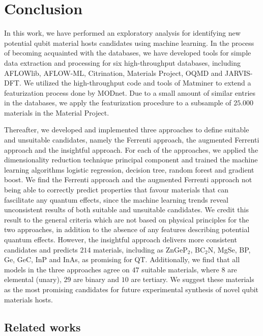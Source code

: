 \chapter*{Conclusion}

In this work, we have performed an exploratory analysis for identifying new potential qubit material hosts candidates using machine learning. In the process of becoming acquainted with the databases, we have developed tools for simple data extraction and processing for six high-throughput databases, including AFLOWlib, AFLOW-ML, Citrination, Materials Project, OQMD and JARVIS-DFT. We utilized the high-throughput code and tools of Matminer to extend a featurization process done by MODnet. Due to a small amount of similar entries in the databases, we apply the featurization procedure to a subsample of $25.000$ materials in the Material Project.

Thereafter, we developed and implemented three approaches to define suitable and unsuitable candidates, namely the Ferrenti approach, the augmented Ferrenti approach and the insightful approach. For each of the approaches, we applied the dimensionality reduction technique principal component and trained the machine learning algorithms logistic regression, decision tree, random forest and gradient boost. We find the Ferrenti approach and the augmented Ferrenti approach not being able to correctly predict properties that favour materials that can fascilitate any quantum effects, since the machine learning trends reveal unconsistent results of both suitable and unsuitable candidates. We credit this result to the general criteria which are not based on physical principles for the two approaches, in addition to the absence of any features describing potential quantum effects. However, the insightful approach delivers more consistent candidates and predicts $214$ materials, including as ZnGeP$_2$, BC$_2$N, MgSe, BP, Ge, GeC, InP and InAs, as promising for QT. Additionally, we find that all models in the three approaches agree on $47$ suitable materials, where $8$ are elemental (unary), $29$ are binary and $10$ are tertiary. We suggest these materials as the most promising candidates for future experimental synthesis of novel qubit materials hosts. %
\clearpage

\section*{Related works}

